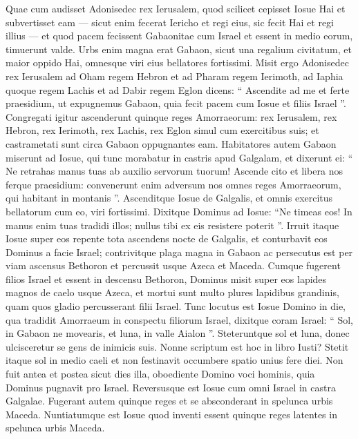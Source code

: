 \begin{biblechapter}
\begin{biblechapter}
\begin{biblechapter}
\begin{biblechapter}
\begin{biblechapter}
\begin{biblechapter}
\begin{biblechapter}
\begin{biblechapter}
\begin{biblechapter}
\begin{biblechapter}
\verse Quae cum audisset Adonisedec rex Ierusalem, quod scilicet cepisset Iosue Hai et subvertisset eam — sicut enim fecerat Iericho et regi eius, sic fecit Hai et regi illius — et quod pacem fecissent Gabaonitae cum Israel et essent in medio eorum, 
\verse timuerunt valde. Urbs enim magna erat Gabaon, sicut una regalium civitatum, et maior oppido Hai, omnesque viri eius bellatores fortissimi. 
\verse Misit ergo Adonisedec rex Ierusalem ad Oham regem Hebron et ad Pharam regem Ierimoth, ad Iaphia quoque regem Lachis et ad Dabir regem Eglon dicens: 
\verse “ Ascendite ad me et ferte praesidium, ut expugnemus Gabaon, quia fecit pacem cum Iosue et filiis Israel ”. 
\verse Congregati igitur ascenderunt quinque reges Amorraeorum: rex Ierusalem, rex Hebron, rex Ierimoth, rex Lachis, rex Eglon simul cum exercitibus suis; et castrametati sunt circa Gabaon oppugnantes eam.
 \verse Habitatores autem Gabaon miserunt ad Iosue, qui tunc morabatur in castris apud Galgalam, et dixerunt ei: “ Ne retrahas manus tuas ab auxilio servorum tuorum! Ascende cito et libera nos ferque praesidium: convenerunt enim adversum nos omnes reges Amorraeorum, qui habitant in montanis ”. 
\verse Ascenditque Iosue de Galgalis, et omnis exercitus bellatorum cum eo, viri fortissimi. 
\verse Dixitque Dominus ad Iosue: “Ne timeas eos! In manus enim tuas tradidi illos; nullus tibi ex eis resistere poterit ”. 
\verse Irruit itaque Iosue super eos repente tota ascendens nocte de Galgalis, 
\verse et conturbavit eos Dominus a facie Israel; contrivitque plaga magna in Gabaon ac persecutus est per viam ascensus Bethoron et percussit usque Azeca et Maceda. 
\verse Cumque fugerent filios Israel et essent in descensu Bethoron, Dominus misit super eos lapides magnos de caelo usque Azeca, et mortui sunt multo plures lapidibus grandinis, quam quos gladio percusserant filii Israel.
 \verse Tunc locutus est Iosue Domino in die, qua tradidit Amorraeum in conspectu filiorum Israel, dixitque coram Israel:
 “ Sol, in Gabaon ne movearis,
 et luna, in valle Aialon ”.
 \verse Steteruntque sol et luna,
 donec ulcisceretur se gens de inimicis suis.
 Nonne scriptum est hoc in libro Iusti? Stetit itaque sol in medio caeli et non festinavit occumbere spatio unius fere diei. 
\verse Non fuit antea et postea sicut dies illa, oboediente Domino voci hominis, quia Dominus pugnavit pro Israel. 
\verse Reversusque est Iosue cum omni Israel in castra Galgalae.
 \verse Fugerant autem quinque reges et se absconderant in spelunca urbis Maceda. 
 \verse Nuntiatumque est Iosue quod inventi essent quinque reges latentes in spelunca urbis Maceda. 

\end{biblechapter}
\end{biblechapter}
\end{biblechapter}
\end{biblechapter}
\end{biblechapter}
\end{biblechapter}
\end{biblechapter}
\end{biblechapter}
\end{biblechapter}
\end{biblechapter}
